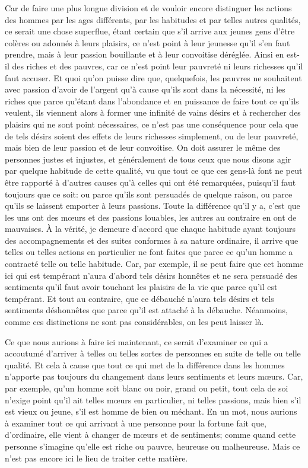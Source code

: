 Car de faire une plus longue division et de vouloir encore distinguer les actions des hommes par les ages différents,
par les habitudes et par telles autres qualités, ce serait une chose superflue, étant certain que s'il arrive aux
jeunes gens d'être colères ou adonnés à leurs plaisirs, ce n'est point à leur jeunesse qu'il s'en faut prendre, mais
à leur passion bouillante et à leur convoitise déréglée. Ainsi en est-il des riches et des pauvres, car ce n'est point
leur pauvreté ni leurs richesses qu'il faut accuser. Et quoi qu'on puisse dire que, quelquefois, les pauvres ne souhaitent
avec passion d'avoir de l'argent qu'à cause qu'ils sont dans la nécessité, ni les riches que parce qu'étant dans l'abondance
et en puissance de faire tout ce qu'ils veulent, ils viennent alors à former une infinité de vains désirs et à rechercher
des plaisirs qui ne sont point nécessaires, ce n'est pas une conséquence pour cela que de tels désirs soient des effets
de leurs richesses simplement, ou de leur pauvreté, mais bien de leur passion et de leur convoitise. On doit assurer le
même des personnes justes et injustes, et généralement de tous ceux que nous disons agir par quelque habitude de cette
qualité, vu que tout ce que ces gens-là font ne peut être rapporté à d'autres causes qu'à celles qui ont été remarquées,
puisqu'il faut toujours que ce soit: ou parce qu'ils sont persuadés de quelque raison, ou parce qu'ils se laissent emporter
à leurs passions. Toute la différence qu'il y a, c'est que les uns ont des mœurs et des passions louables, les autres au
contraire en ont de mauvaises. À la vérité, je demeure d'accord que chaque habitude ayant toujours des accompagnements et
des suites conformes à sa nature ordinaire, il arrive que telles ou telles actions en particulier ne font faites que parce
ce qu'un homme a contracté telle ou telle habitude. Car, par exemple, il se peut faire que cet homme ici qui est tempérant
n'aura d'abord tels désirs honnêtes et ne sera persuadé des sentiments qu'il faut avoir touchant les plaisirs de la vie
que parce qu'il est tempérant. Et tout au contraire, que ce débauché n'aura tels désirs et tels sentiments déshonnêtes que
parce qu'il est attaché à la débauche. Néanmoins, comme ces distinctions ne sont pas considérables, on les peut laisser là.

\bigbreak

Ce que nous aurions à faire ici maintenant, ce serait d'examiner ce qui a accoutumé d'arriver à telles ou telles sortes de
personnes en suite de telle ou telle qualité. Et cela à cause que tout ce qui met de la différence dans les hommes n'apporte
pas toujours du changement dans leurs sentiments et leurs mœurs. Car, par exemple, qu'un homme soit blanc ou noir, grand ou
petit, tout cela de soi n'exige point qu'il ait telles mœurs en particulier, ni telles passions, mais bien s'il est vieux ou
jeune, s'il est homme de bien ou méchant. En un mot, nous aurions à examiner tout ce qui arrivant à une personne pour la fortune
fait que, d'ordinaire, elle vient à changer de mœurs et de sentiments; comme quand cette personne s'imagine qu'elle est riche ou
pauvre, heureuse ou malheureuse. Mais ce n'est pas encore ici le lieu de traiter cette matière. 

